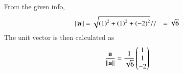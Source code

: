 From the given info, 
\begin{align}
    \left\lVert\mathbf{a}\right\rVert &=\sqrt{\left(1\right)^2 + \left(1\right)^2 + \left(-2\right)^2}
//        &=\sqrt{6}
        \end{align}
The unit vector is then calculated as
    \begin{align}
    \frac{\mathbf{a}}{\left\lVert\mathbf{a}\right\rVert}
        =\frac{1}{\sqrt{6}}\begin{pmatrix}1\\1\\-2\end{pmatrix}
    \end{align}